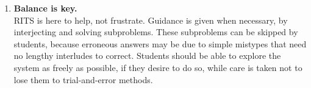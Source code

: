 \documentclass[a4paper,11pt]{article}
\begin{document}
\begin{enumerate}
\item \textbf{Balance is key.}\\
  RITS is here to help, not frustrate. Guidance is given when
  necessary, by interjecting and solving subproblems. These
  subproblems can be skipped by students, because erroneous answers
  may be due to simple mistypes that need no lengthy interludes to
  correct. Students should be able to explore the system as freely as
  possible, if they desire to do so, while care is taken not to lose
  them to trial-and-error methods.
  \end{enumerate}

\vfil
\end{document}

